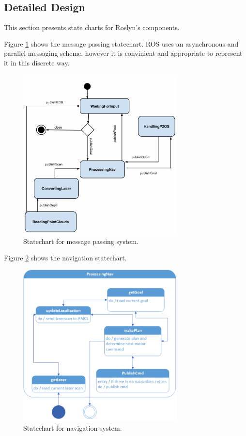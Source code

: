 \documentclass[11pt]{report}
\begin{document}
\subsection{Detailed Design}
This section presents state charts for Roslyn's components.

Figure \ref{fig:Low_level_message_passing_diagram} shows the message passing statechart. ROS uses an asynchronous and parallel messaging scheme, however it is convinient and appropriate to represent it in this discrete way.
\begin{figure}[H]
 \centering
 \includegraphics[width=0.75\textwidth]{Low_level_message_passing_diagram.pdf}
 \caption{Statechart for message passing system.}
 \label{fig:Low_level_message_passing_diagram}
\end{figure}

Figure \ref{fig:processing_nav_statechart} shows the navigation statechart.
\begin{figure}[H]
 \centering
 \includegraphics[width=0.75\textwidth]{processing_nav_statechart.pdf}
 \caption{Statechart for navigation system.}
 \label{fig:processing_nav_statechart}
\end{figure}
\end{document}
